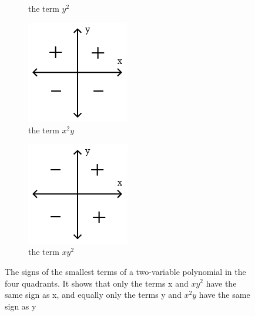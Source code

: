 \begin{figure}[ht]
\begin{subfigure}{.25\textwidth}
  \caption{the term $y^2$}
  \label{fig:sign-y2}
\end{subfigure}
\begin{subfigure}{0.25\textwidth}
  \centering
  \includegraphics[width=0.9\linewidth]{Pictures/signs-in-quadrants-horisontal-cropped.png}
  \caption{the term $x^2y$}
  \label{fig:sign-x2y}
\end{subfigure}
\begin{subfigure}{.25\textwidth}
  \centering
  \includegraphics[width=0.9\linewidth]{Pictures/signs-in-quadrants-vertical-cropped.png}
  \caption{the term $xy^2$}
  \label{fig:sign-xy2}
\end{subfigure}
\caption{The signs of the smallest terms of a two-variable polynomial in the four quadrants. It shows that only the terms x and $xy^2$ have the same sign as x, and equally only the terms y and $x^2y$ have the same sign as y}
\label{fig:signs-in-quadrants}
\end{figure}

